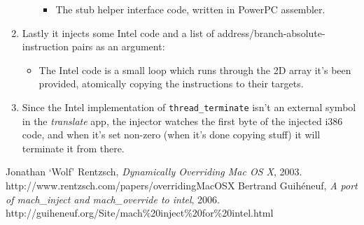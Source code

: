 \documentclass[english]{article}
\begin{document}
\begin{enumerate}
\begin{enumerate}
\begin{itemize}
      \item The stub helper interface code, written in PowerPC assembler.
    \end{itemize}
  \end{enumerate}
  \item Lastly it injects some Intel code and a list of address/branch-absolute-instruction pairs as an argument:
  \begin{itemize}
    \item The Intel code is a small loop which runs through the 2D array it's been provided, atomically copying the instructions to their targets.
  \end{itemize}
  \item Since the Intel implementation of \texttt{thread\_terminate} isn't an external symbol in the \textsl{translate} app, the injector watches the first byte of the injected i386 code, and when it's set non-zero (when it's done copying stuff) it will terminate it from there.
\end{enumerate}

\begin{thebibliography}{9}
    Jonathan `Wolf' Rentzsch,
    \emph{Dynamically Overriding Mac OS X},
    2003. \\
    http://www.rentzsch.com/papers/overridingMacOSX
    Bertrand Guih\'{e}neuf,
    \emph{A port of mach\_inject and mach\_override to intel},
    2006. \\
    http://guiheneuf.org/Site/mach\%20inject\%20for\%20intel.html
\end{thebibliography}
\end{document}
